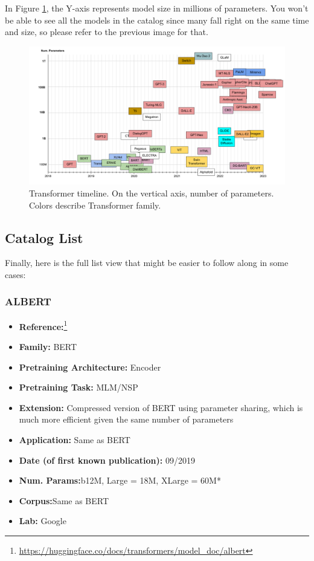 \documentclass{article}
\begin{document}
In Figure \ref{fig:timelineSize}, the Y-axis represents model size in millions of parameters. You won't be able to see all the models in the catalog since many fall right on the same time and size, so please refer to the previous image for that.

\begin{figure}
    \centering
    \includegraphics[width=\textwidth,height=\textheight,keepaspectratio]{02-09.png}
    \caption{Transformer timeline. On the vertical axis, number of parameters. Colors describe Transformer family.}
    \label{fig:timelineSize}
\end{figure}

\subsection{Catalog List}

Finally, here is the full list view that might be easier to follow along in some cases:

\subsubsection{ALBERT}
            \begin{itemize}
                \item \textbf{Reference:}\footnote{\url{https://huggingface.co/docs/transformers/model_doc/albert}}\cite{lan2019albert}
                \item \textbf{Family:} BERT
                \item \textbf{Pretraining Architecture:} Encoder
                \item \textbf{Pretraining Task:} MLM/NSP
                \item \textbf{Extension:} Compressed version of BERT using parameter sharing, which is much more efficient given the same number of parameters
                \item \textbf{Application:} Same as BERT
                \item \textbf{Date (of first known publication):} 09/2019
                \item \textbf{Num. Params:}b12M, Large = 18M, XLarge = 60M*
                \item \textbf{Corpus:}Same as BERT
                \item \textbf{Lab:} Google
            \end{itemize}
\end{document}
